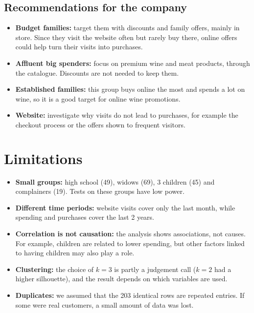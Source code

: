 \documentclass[11pt,a4paper]{article}
\begin{document}
\subsection{Recommendations for the company}
\begin{itemize}
	\item \textbf{Budget families:} target them with discounts and family offers, mainly in store. Since they visit the website often but rarely buy there, online offers could help turn their visits into purchases.
	\item \textbf{Affluent big spenders:} focus on premium wine and meat products, through the catalogue. Discounts are not needed to keep them.
	\item \textbf{Established families:} this group buys online the most and spends a lot on wine, so it is a good target for online wine promotions.
	\item \textbf{Website:} investigate why visits do not lead to purchases, for example the checkout process or the offers shown to frequent visitors.
\end{itemize}

\section{Limitations}
\begin{itemize}
	\item \textbf{Small groups:} high school (49), widows (69), 3 children (45) and complainers (19). Tests on these groups have low power.
	\item \textbf{Different time periods:} website visits cover only the last month, while spending and purchases cover the last 2 years.
	\item \textbf{Correlation is not causation:} the analysis shows associations, not causes. For example, children are related to lower spending, but other factors linked to having children may also play a role.
	\item \textbf{Clustering:} the choice of $k = 3$ is partly a judgement call ($k = 2$ had a higher silhouette), and the result depends on which variables are used.
	\item \textbf{Duplicates:} we assumed that the 203 identical rows are repeated entries. If some were real customers, a small amount of data was lost.
\end{itemize}
\end{document}

